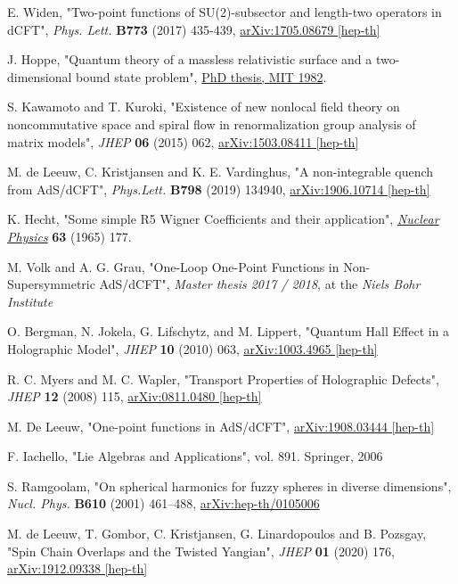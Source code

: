 \documentclass[a4paper,12pt]{article}
\theoremstyle{definition}
\theoremstyle{theorem}
\numberwithin{equation}{subsection}
\begin{document}
\begin{thebibliography}{9}
E. Widen, 
"Two-point functions of SU(2)-subsector and length-two operators in dCFT", 
\textit{Phys. Lett.} \textbf{B773} (2017) 435-439, 
\href{https://arxiv.org/abs/1705.08679}{arXiv:1705.08679 [hep-th]}

J. Hoppe, 
"Quantum theory of a massless relativistic surface and a two-dimensional bound state problem", 
\href{https://dspace.mit.edu/handle/1721.1/15717}{PhD thesis, MIT 1982}.

S. Kawamoto and T. Kuroki, 
"Existence of new nonlocal field theory on noncommutative space and spiral flow in renormalization group analysis of matrix models", 
\textit{JHEP} \textbf{06} (2015) 062, 
\href{https://arxiv.org/abs/1503.08411}{arXiv:1503.08411 [hep-th]}

M. de Leeuw, C. Kristjansen and K. E. Vardinghus, 
"A non-integrable quench from AdS/dCFT", 
\textit{Phys.Lett.} \textbf{B798} (2019) 134940, 
\href{https://arxiv.org/abs/1906.10714}{arXiv:1906.10714 [hep-th]}

K. Hecht, 
"Some simple R5 Wigner Coefficients and their application", 
\href{https://www.sciencedirect.com/science/article/pii/002955826590338X}{\textit{Nuclear Physics}} \textbf{63}
(1965) 177.

M. Volk and A. G. Grau, 
"One-Loop One-Point Functions in Non-Supersymmetric AdS/dCFT", 
\textit{Master thesis 2017 / 2018}, 
at the \textit{Niels Bohr Institute}

O. Bergman, N. Jokela, G. Lifschytz, and M. Lippert, 
"Quantum Hall Effect in a Holographic Model", 
\textit{JHEP} \textbf{10} (2010) 063, 
\href{https://arxiv.org/abs/1003.4965}{arXiv:1003.4965 [hep-th]}

R. C. Myers and M. C. Wapler, 
"Transport Properties of Holographic Defects", 
\textit{JHEP} \textbf{12} (2008) 115, 
\href{https://arxiv.org/abs/0811.0480}{arXiv:0811.0480 [hep-th]}

M. De Leeuw, 
"One-point functions in AdS/dCFT", 
\href{https://arxiv.org/abs/1908.03444}{arXiv:1908.03444 [hep-th]}

F. Iachello, 
"Lie Algebras and Applications", 
vol. 891. Springer, 
2006

S. Ramgoolam, 
"On spherical harmonics for fuzzy spheres in diverse dimensions", 
\textit{Nucl. Phys.} \textbf{B610} (2001) 461–488, 
\href{https://arxiv.org/abs/hep-th/0105006}{arXiv:hep-th/0105006}

M. de Leeuw, T. Gombor, C. Kristjansen, G. Linardopoulos and B. Pozsgay, 
"Spin Chain Overlaps and the Twisted Yangian", 
\textit{JHEP} \textbf{01} (2020) 176, 
\href{https://arxiv.org/abs/1912.09338}{arXiv:1912.09338 [hep-th]}

\end{thebibliography}
\end{document}
